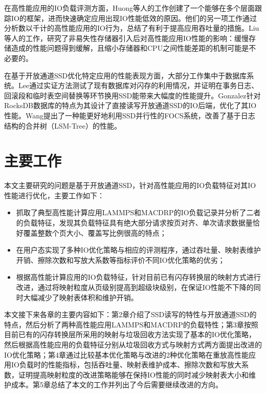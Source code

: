在高性能应用的IO负载评测方面，Huong等人的工作\cite{luu_multi-level_nodate}创建了一个能够在多个层面跟踪IO的框架，进而快速确定应用出现IO性能低效的原因。他们的另一项工作\cite{luu_multiplatform_2015}通过分析数以千计的高性能应用的IO行为，总结了有利于提高应用吞吐量的措施。Liu等人的工作\cite{liu_performance_2017}，研究了非易失性存储器引入后对高性能应用IO性能的影响：缓慢存储造成的性能问题得到缓解，且缩小存储器和CPU之间性能差距的机制可能是不必要的。

在基于开放通道SSD优化特定应用的性能表现方面，大部分工作集中于数据库系统。Lee\cite{lee_case_2008}通过实证方法测试了现有数据库对闪存的利用情况，并证明在事务日志、回滚段和临时表空间替换等环节换用SSD能带来大幅度的性能提升。Gonzalez\cite{gonzalez_towards_nodate}针对RocksDB数据库的特点为其设计了直接读写开放通道SSD的IO后端，优化了其IO性能。Wang\cite{wang_efficient_2014}提出了一种能更好地利用SSD并行性的FOCS系统，改善了基于日志结构的合并树（LSM-Tree）的性能。

\section{主要工作}
本文主要研究的问题是基于开放通道SSD，针对高性能应用的IO负载特征对其IO性能进行优化，主要工作如下：
\begin{itemize}
    \item 抓取了典型高性能计算应用LAMMPS和MACDRP的IO负载记录并分析了二者的负载特征，发现其负载特征具有绝大部分请求按页对齐、单次请求数据量恰好覆盖整数个页大小、覆盖写比例很高的特点；
    \item 在用户态实现了多种IO优化策略与相应的评测程序，通过吞吐量、映射表维护开销、擦除次数和写放大系数等指标评价不同IO优化策略的优劣；
    \item 根据高性能计算应用的IO负载特征，针对目前已有闪存转换层的映射方式进行改进，通过将映射粒度从页级别提高到超级块级别，在保证IO性能不下降的同时大幅减少了映射表体积和维护开销。
\end{itemize}

本文接下来各章的主要内容如下：第2章介绍了SSD读写的特性与开放通道SSD的特点，然后分析了两种高性能应用LAMMPS和MACDRP的负载特性；第3章按照目前已有的闪存转换层所采用的映射与垃圾回收方法实现了基本的IO优化策略，然后根据高性能应用的负载特征分别从垃圾回收方式与映射方式两方面提出改进的IO优化策略；第4章通过比较基本优化策略与改进的2种优化策略在重放高性能应用IO负载时的性能指标，包括吞吐量、映射表维护成本、擦除次数和写放大系数，证明提高映射粒度的改进策略能够在保持IO性能的同时减少映射表大小和维护成本。第5章总结了本文的工作并列出了今后需要继续改进的方向。